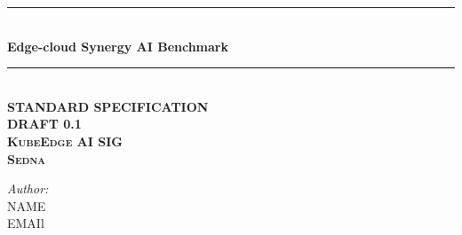\documentclass{book}
\newcommand{\HRule}{\rule{\linewidth}{0.5mm}} %
\newcommand{\ignore}[1]{{}}
\begin{document}
\begin{titlepage}

\center %



\HRule \\[0.4cm]
{ \huge \bfseries Edge-cloud Synergy AI Benchmark}\\[0.4cm] %
\HRule \\[1.5cm]

\textsc{\huge \textbf{STANDARD SPECIFICATION}}\\[1.5cm]

\textsc{\Large \textbf{DRAFT 0.1 \\[0.07cm] KubeEdge AI SIG \\[0.24cm] Sedna}}\\[1.5cm]



\vspace{0.8cm}
\begin{minipage}{0.4\textwidth}
\begin{flushleft} \large
\Large \emph{Author:}\\[0.1cm]
\Large NAME \\
EMAIl
\end{flushleft}
\end{minipage}
\ignore{
~
\begin{minipage}{0.4\textwidth}
\begin{flushright} \large
\Large \emph{Companys:} \\[0.1cm]
\Large Company1 \\
email1 \\[0.1cm]
\end{flushright}
\vspace{-1.47cm}
\end{minipage}\\[3cm]
}


\end{titlepage}
\end{document}
